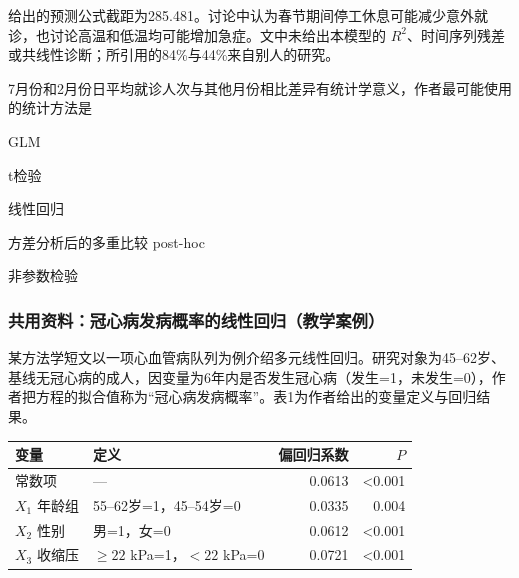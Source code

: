 给出的预测公式截距为285.481。讨论中认为春节期间停工休息可能减少意外就诊，也讨论高温和低温均可能增加急症。文中未给出本模型的 \(R^2\)、时间序列残差或共线性诊断；所引用的84\%与44\%来自别人的研究。


\par\addvspace{6pt}\noindent\begin{minipage}{\linewidth}


7月份和2月份日平均就诊人次与其他月份相比差异有统计学意义，作者最可能使用的统计方法是


\begin{choices}

\item GLM

\item t检验

\item 线性回归

\item 方差分析后的多重比较 post-hoc

\item 非参数检验

\end{choices}

\end{minipage}\par\vspace{4pt}

\subsubsection*{共用资料：冠心病发病概率的线性回归（教学案例）}

某方法学短文以一项心血管病队列为例介绍多元线性回归。研究对象为45--62岁、基线无冠心病的成人，因变量为6年内是否发生冠心病（发生=1，未发生=0），作者把方程的拟合值称为``冠心病发病概率''。表1为作者给出的变量定义与回归结果。

\begin{center}\small\setlength{\tabcolsep}{4pt}\renewcommand{\arraystretch}{1.18}\begin{tabular}{@{}llrr@{}}
\toprule
变量 & 定义 & 偏回归系数 & \(P\) \\
\midrule
常数项 & --- & 0.0613 & \textless0.001 \\
\(X_1\) 年龄组 & 55--62岁=1，45--54岁=0 & 0.0335 & 0.004 \\
\(X_2\) 性别 & 男=1，女=0 & 0.0612 & \textless0.001 \\
\(X_3\) 收缩压 & \(\ge22\) kPa=1，\(<22\) kPa=0 & 0.0721 & \textless0.001 \\
\bottomrule\end{tabular}\end{center}


